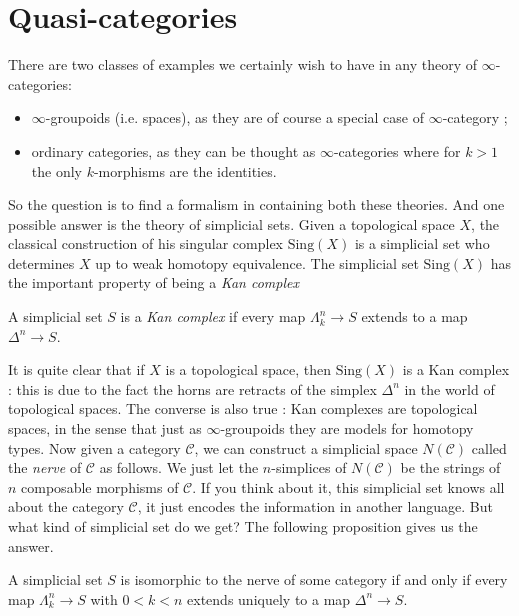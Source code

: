 \section{Quasi-categories}

There are two classes of examples we certainly wish to have in any theory of $\infty$-categories:
\begin{itemize}
\item $\infty$-groupoids (i.e. spaces), as they are of course a special case of $\infty$-category ;
\item ordinary categories, as they can be thought as $\infty$-categories where for $k >1$ the only $k$-morphisms are the identities.
\end{itemize}

So the question is to find a formalism in containing both these theories. And one possible answer is the theory of simplicial sets. Given a topological space $X$, the classical construction of his singular complex $\text{Sing}(X)$ is a simplicial set who determines $X$ up to weak homotopy equivalence. The simplicial set $\text{Sing}(X)$ has the important property of being a \emph{Kan complex}

\begin{defin}
A simplicial set $S$ is a \emph{Kan complex} if every map $\Lambda_k^n \to S$ extends to a map $\Delta^n \to S$.
\end{defin}

It is quite clear that if $X$ is a topological space, then $\text{Sing}(X)$ is a Kan complex : this is due to the fact the horns are retracts of the simplex $\Delta^n$ in the world of topological spaces. The converse is also true : Kan complexes are topological spaces, in the sense that just as $\infty$-groupoids they are models for homotopy types.
Now given a category $\mathcal C$, we can construct a simplicial space $N(\mathcal C)$ called the \emph{nerve} of $\mathcal C$ as follows. We just let the $n$-simplices of $N(\mathcal C)$ be the strings of $n$ composable morphisms of $\mathcal C$. If you think about it, this simplicial set knows all about the category $\mathcal C$, it just encodes the information in another language. But what kind of simplicial set do we get? The following proposition gives us the answer.

\begin{prop}
A simplicial set $S$ is isomorphic to the nerve of some category if and only if every map $\Lambda_k^n \to S$ with $0<k<n$ extends uniquely to a map $\Delta^n \to S$.
\end{prop}

